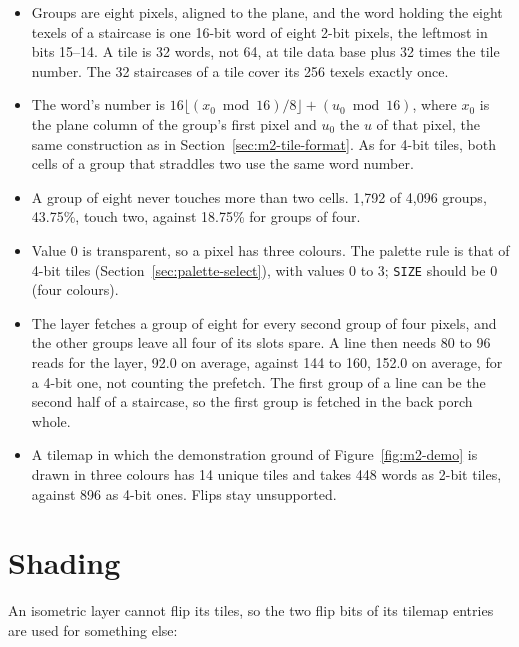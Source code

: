 \begin{itemize}
	\item Groups are eight pixels, aligned to the plane, and the word holding the eight texels of a staircase is one 16-bit word
	      of eight 2-bit pixels, the leftmost in bits 15--14. A tile is 32 words, not 64, at tile data base plus 32 times the
	      tile number. The 32 staircases of a tile cover its 256 texels exactly once.
	\item The word's number is $16 \lfloor (x_0 \bmod 16)/8 \rfloor + (u_0 \bmod 16)$, where $x_0$ is the plane column of the
	      group's first pixel and $u_0$ the $u$ of that pixel, the same construction as in Section~\ref{sec:m2-tile-format}. As
	      for 4-bit tiles, both cells of a group that straddles two use the same word number.
	\item A group of eight never touches more than two cells. 1,792 of 4,096 groups, 43.75\%, touch two, against 18.75\% for
	      groups of four.
	\item Value 0 is transparent, so a pixel has three colours. The palette rule is that of 4-bit tiles
	      (Section~\ref{sec:palette-select}), with values 0 to 3; \texttt{SIZE} should be 0 (four colours).
	\item The layer fetches a group of eight for every second group of four pixels, and the other groups leave all four of its
	      slots spare. A line then needs 80 to 96 reads for the layer, 92.0 on average, against 144 to 160, 152.0 on average, for
	      a 4-bit one, not counting the prefetch. The first group of a line can be the second half of a staircase, so the first
	      group is fetched in the back porch whole.
	\item A tilemap in which the demonstration ground of Figure~\ref{fig:m2-demo} is drawn in three colours has 14 unique tiles
	      and takes 448 words as 2-bit tiles, against 896 as 4-bit ones. Flips stay unsupported.
\end{itemize}

\section{Shading}
\label{sec:m2-shading}

An isometric layer cannot flip its tiles, so the two flip bits of its tilemap entries are used for something else:

